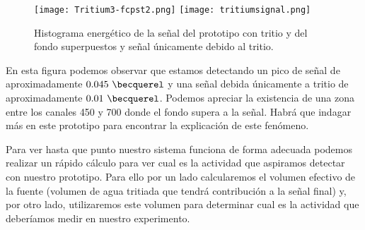 \begin{figure}[htb]
\centering
{
\texttt{[image: Tritium3-fcpst2.png]} 
}
{
\texttt{[image: tritiumsignal.png]} 
}
\caption{Histograma energético de la señal del prototipo con tritio y del fondo superpuestos y señal únicamente debido al tritio.\label{senaltritio}}
\end{figure}


En esta figura podemos observar que estamos detectando un pico de señal de aproximadamente $0.045~\becquerel$ y una señal debida únicamente a tritio de aproximadamente $0.01~\becquerel$. Podemos apreciar la existencia de una zona entre los canales 450 y 700 donde el fondo supera a la señal. Habrá que indagar más en este prototipo para encontrar la explicación de este fenómeno.

Para ver hasta que punto nuestro sistema funciona de forma adecuada podemos realizar un rápido cálculo para ver cual es la actividad que aspiramos detectar con nuestro prototipo. Para ello por un lado calcularemos el volumen efectivo de la fuente (volumen de agua tritiada que tendrá contribución a la señal final) y, por otro lado, utilizaremos este volumen para determinar cual es la actividad que deberíamos medir en nuestro experimento.

